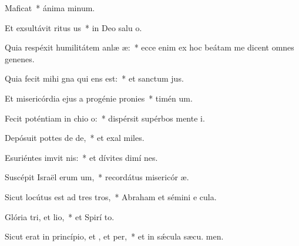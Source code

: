 \item Maficat~* ánima  minum.
\item Et exsultávit ritus us~* in Deo salu o.
\item Quia respéxit humilitátem anlæ æ:~* ecce enim ex hoc beátam me dicent omnes genenes.
\item Quia fecit mihi gna qui ens est:~* et sanctum  jus.
\item Et misericórdia ejus a progénie  pronies~* timén um.
\item Fecit poténtiam in chio o:~* dispérsit supérbos mente  i.
\item Depósuit pottes de de,~* et exal miles.
\item Esuriéntes imvit nis:~* et dívites dimí nes.
\item Suscépit Israël erum um,~* recordátus misericór æ.
\item Sicut locútus est ad tres tros,~* Abraham et sémini e  cula.
\item Glória tri, et lio,~* et Spirí to.
\item Sicut erat in princípio, et , et per,~* et in sǽcula sæcu. men.
